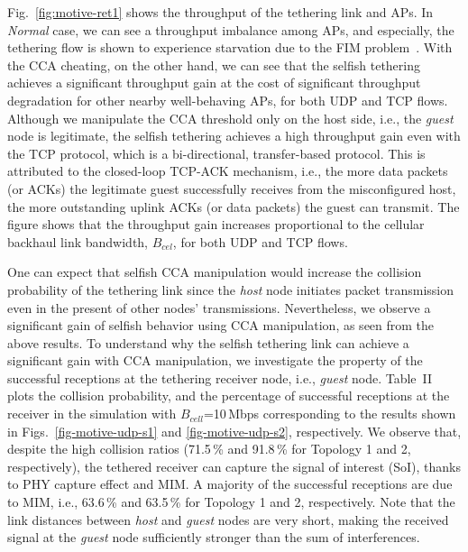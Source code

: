 Fig.~\ref{fig:motive-ret1} shows the throughput of the tethering link
and APs. In \emph{Normal} case, we can see a throughput imbalance
among APs, and especially, the tethering flow is shown to experience
starvation due to the FIM problem~\cite{FIM08}.
%
With the CCA cheating, on the other hand, we can see that the
selfish tethering achieves a significant throughput gain at the cost
of significant throughput degradation for other nearby well-behaving
APs, for both UDP and TCP flows.
%
%
%
Although we manipulate the CCA threshold only on the host side,
i.e., the \emph{guest} node is legitimate, the selfish tethering
achieves a high throughput gain even with the TCP protocol,
which is a bi-directional, transfer-based protocol.
%
This is attributed to the closed-loop TCP-ACK mechanism, i.e., the
more data packets (or ACKs) the legitimate guest successfully receives
from the misconfigured host, the more outstanding uplink ACKs (or data
packets) the guest can transmit.
%
The figure shows that the throughput gain increases proportional to
the cellular backhaul link bandwidth, $B_{cel}$, for both UDP and TCP
flows.


One can expect that selfish CCA manipulation would increase the
collision probability of the tethering link since the \emph{host}
node initiates packet transmission even in the present of other
nodes' transmissions. Nevertheless, we observe a significant gain
of selfish behavior using CCA manipulation, as seen from the above results.
%
To understand why the selfish tethering link can achieve a significant
gain with CCA manipulation, we investigate the property of the
successful receptions at the tethering receiver node, i.e.,
\emph{guest} node.
%
Table~II plots the collision probability, and the percentage of
successful receptions at the receiver in the simulation
with $B_{cell}$=10\,Mbps corresponding to the results shown
in Figs.~\ref{fig-motive-udp-s1} and \ref{fig-motive-udp-s2}, respectively.
We observe that, despite the high collision ratios (71.5\,\% and 91.8\,\%
for Topology 1 and 2, respectively), the tethered receiver can capture
the signal of interest (SoI), thanks to PHY capture effect and MIM.
A majority of the successful receptions are due to MIM, i.e., 63.6\,\%
and 63.5\,\% for Topology 1 and 2, respectively.
Note that the link distances between \emph{host} and \emph{guest}
nodes are very short, making the received signal at the \emph{guest}
node sufficiently stronger than the sum of interferences.

